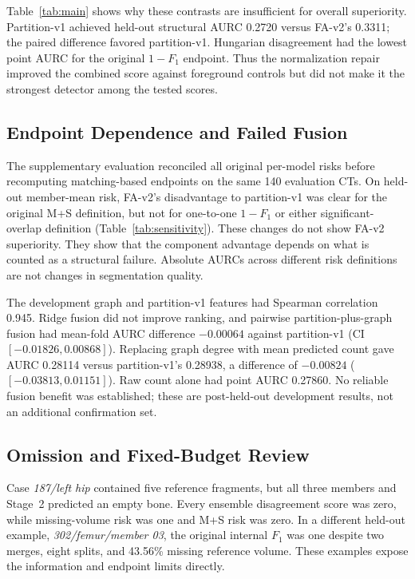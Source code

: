 \documentclass[conference]{IEEEtran}
\begin{document}
Table~\ref{tab:main} shows why these contrasts are insufficient for overall superiority. Partition-v1 achieved held-out structural AURC 0.2720 versus FA-v2's 0.3311; the paired difference favored partition-v1. Hungarian disagreement had the lowest point AURC for the original $1-F_1$ endpoint. Thus the normalization repair improved the combined score against foreground controls but did not make it the strongest detector among the tested scores.


\subsection{Endpoint Dependence and Failed Fusion}
The supplementary evaluation reconciled all original per-model risks before recomputing matching-based endpoints on the same 140 evaluation CTs. On held-out member-mean risk, FA-v2's disadvantage to partition-v1 was clear for the original M+S definition, but not for one-to-one $1-F_1$ or either significant-overlap definition (Table~\ref{tab:sensitivity}). These changes do not show FA-v2 superiority. They show that the component advantage depends on what is counted as a structural failure. Absolute AURCs across different risk definitions are not changes in segmentation quality.

The development graph and partition-v1 features had Spearman correlation 0.945. Ridge fusion did not improve ranking, and pairwise partition-plus-graph fusion had mean-fold AURC difference $-0.00064$ against partition-v1 (CI $[-0.01826,0.00868]$). Replacing graph degree with mean predicted count gave AURC 0.28114 versus partition-v1's 0.28938, a difference of $-0.00824$ ($[-0.03813,0.01151]$). Raw count alone had point AURC 0.27860. No reliable fusion benefit was established; these are post-held-out development results, not an additional confirmation set.

\subsection{Omission and Fixed-Budget Review}
Case \emph{187/left hip} contained five reference fragments, but all three members and Stage~2 predicted an empty bone. Every ensemble disagreement score was zero, while missing-volume risk was one and M+S risk was zero. In a different held-out example, \emph{302/femur/member 03}, the original internal $F_1$ was one despite two merges, eight splits, and 43.56\% missing reference volume. These examples expose the information and endpoint limits directly.
\end{document}
